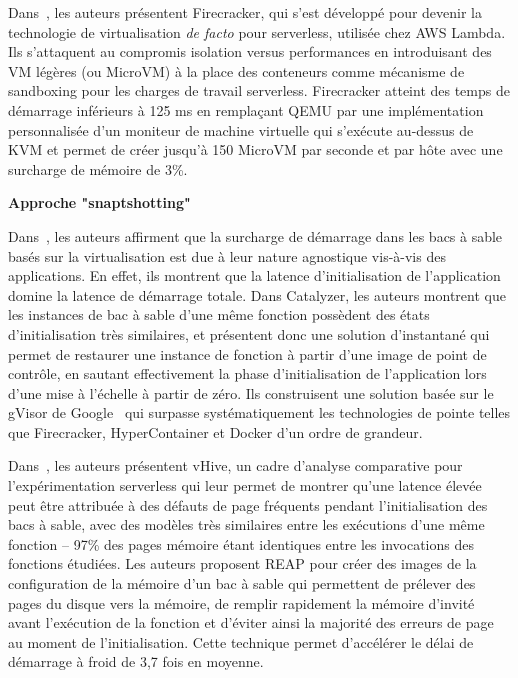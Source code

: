 Dans~\cite{agacheFirecrackerLightweightVirtualization}, les auteurs présentent Firecracker, qui s'est développé pour devenir la technologie de virtualisation \textit{de facto} pour serverless, utilisée chez AWS Lambda. Ils s'attaquent au compromis isolation versus performances en introduisant des VM légères (ou MicroVM) à la place des conteneurs comme mécanisme de sandboxing pour les charges de travail serverless. Firecracker atteint des temps de démarrage inférieurs à 125 ms en remplaçant QEMU par une implémentation personnalisée d'un moniteur de machine virtuelle qui s'exécute au-dessus de KVM et permet de créer jusqu'à 150 MicroVM par seconde et par hôte avec une surcharge de mémoire de 3\%.

\textbf{Approche "snaptshotting"} \label{sota-snapshotting}

Dans~\cite{duCatalyzerSubmillisecondStartup2020}, les auteurs affirment que la surcharge de démarrage dans les bacs à sable basés sur la virtualisation est due à leur nature agnostique vis-à-vis des applications. En effet, ils montrent que la latence d'initialisation de l'application domine la latence de démarrage totale. Dans Catalyzer, les auteurs montrent que les instances de bac à sable d'une même fonction possèdent des états d'initialisation très similaires, et présentent donc une solution d'instantané qui permet de restaurer une instance de fonction à partir d'une image de point de contrôle, en sautant effectivement la phase d'initialisation de l'application lors d'une mise à l'échelle à partir de zéro. Ils construisent une solution basée sur le gVisor de Google~\cite{gvisor} qui surpasse systématiquement les technologies de pointe telles que Firecracker\cite{agacheFirecrackerLightweightVirtualization}, HyperContainer et Docker d'un ordre de grandeur.

Dans~\cite{ustiugovBenchmarkingAnalysisOptimization2021}, les auteurs présentent vHive, un cadre d'analyse comparative pour l'expérimentation serverless qui leur permet de montrer qu'une latence élevée peut être attribuée à des défauts de page fréquents pendant l'initialisation des bacs à sable, avec des modèles très similaires entre les exécutions d'une même fonction -- 97\% des pages mémoire étant identiques entre les invocations des fonctions étudiées. Les auteurs proposent REAP pour créer des images de la configuration de la mémoire d'un bac à sable qui permettent de prélever des pages du disque vers la mémoire, de remplir rapidement la mémoire d'invité avant l'exécution de la fonction et d'éviter ainsi la majorité des erreurs de page au moment de l'initialisation. Cette technique permet d'accélérer le délai de démarrage à froid de 3,7 fois en moyenne.

